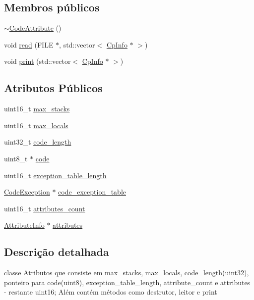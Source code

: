 \subsection*{Membros públicos}
\begin{DoxyCompactItemize}
\item 
\hyperlink{class_code_attribute_a4053ae31518d02d7b374284b05217a7b}{$\sim$\+Code\+Attribute} ()
\item 
void \hyperlink{class_code_attribute_ae5c7888c59b2a2990798c597c014a2ac}{read} (F\+I\+LE $\ast$, std\+::vector$<$ \hyperlink{class_cp_info}{Cp\+Info} $\ast$ $>$)
\item 
void \hyperlink{class_code_attribute_a380eb04a01b0a0db351cf74443067ba4}{print} (std\+::vector$<$ \hyperlink{class_cp_info}{Cp\+Info} $\ast$ $>$)
\end{DoxyCompactItemize}
\subsection*{Atributos Públicos}
\begin{DoxyCompactItemize}
\item 
uint16\+\_\+t \hyperlink{class_code_attribute_aa98def02b93e04d31b8e5c1cc12458f8}{max\+\_\+stacks}
\item 
uint16\+\_\+t \hyperlink{class_code_attribute_a5e2d72942cf05feb8a512fcae6c3b2f3}{max\+\_\+locals}
\item 
uint32\+\_\+t \hyperlink{class_code_attribute_a78ee2a78d9310a51b91d07b39813bc73}{code\+\_\+length}
\item 
uint8\+\_\+t $\ast$ \hyperlink{class_code_attribute_a95d8e9c3e0b93220defcbc9852ec6c27}{code}
\item 
uint16\+\_\+t \hyperlink{class_code_attribute_a2ccde57be0af451e0bf4dcae05e67cc7}{exception\+\_\+table\+\_\+length}
\item 
\hyperlink{class_code_exception}{Code\+Exception} $\ast$ \hyperlink{class_code_attribute_abfc09247d38ec6d587a9059db38103ae}{code\+\_\+exception\+\_\+table}
\item 
uint16\+\_\+t \hyperlink{class_code_attribute_a7a5c471692a3376b19d7b55b034b7c45}{attributes\+\_\+count}
\item 
\hyperlink{class_attribute_info}{Attribute\+Info} $\ast$ \hyperlink{class_code_attribute_a99297a4945c876dd5615d84986043c21}{attributes}
\end{DoxyCompactItemize}


\subsection{Descrição detalhada}
classe Atributos que consiste em max\+\_\+stacks, max\+\_\+locals, code\+\_\+length(uint32), ponteiro para code(uint8), exception\+\_\+table\+\_\+length, attribute\+\_\+count e attributes -\/ restante uint16; Além contém métodos como destrutor, leitor e print 

